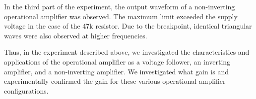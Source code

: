 \documentclass{article}
\begin{document}
In the third part of the experiment, the output waveform of a non-inverting operational amplifier was observed. The maximum limit exceeded the supply voltage in the case of the 47k resistor. Due to the breakpoint, identical triangular waves were also observed at higher frequencies.\par

Thus, in the experiment described above, we investigated the characteristics and applications of the operational amplifier as a voltage follower, an inverting amplifier, and a non-inverting amplifier. We investigated what gain is and experimentally confirmed the gain for these various operational amplifier configurations.
\end{document}
